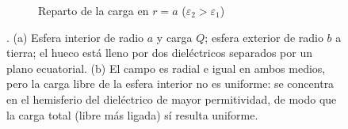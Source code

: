 \begin{figure}[t]
\begin{subfigure}[b]{0.47\textwidth}
\caption{Reparto de la carga en $r=a$ ($\varepsilon_2>\varepsilon_1$)}
\end{subfigure}
\caption{. (a) Esfera interior de radio $a$ y carga $Q$; esfera exterior de radio $b$ a tierra; el hueco
está lleno por dos dieléctricos separados por un plano ecuatorial. (b) El campo es radial e igual en ambos
medios, pero la carga libre de la esfera interior no es uniforme: se concentra en el hemisferio del
dieléctrico de mayor permitividad, de modo que la carga total (libre más ligada) sí resulta uniforme.}
\label{fig:p48}
\end{figure}
